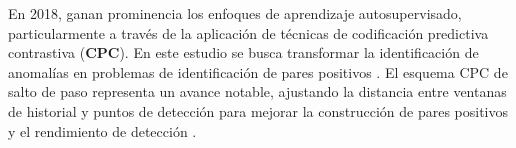 En 2018, ganan prominencia los enfoques de aprendizaje autosupervisado, particularmente a través de la aplicación de técnicas de codificación predictiva contrastiva (\textbf{CPC}). En este estudio se busca transformar la identificación de anomalías en problemas de identificación de pares positivos \cite{noauthor_180703748_nodate}. El esquema CPC de salto de paso representa un avance notable, ajustando la distancia entre ventanas de historial y puntos de detección para mejorar la construcción de pares positivos y el rendimiento de detección \cite{zhang_skip-step_2024}.
